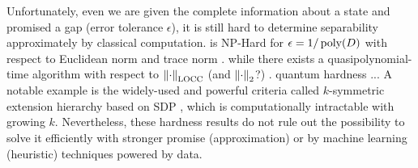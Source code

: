\documentclass[
aps,
pra,
twocolumn,
floatfix,
]{revtex4-2}
\theoremstyle{plain}
\newtheorem{theorem}{Theorem}
\theoremstyle{definition}
\newcommand{\locc}{\textup{LOCC}}
\begin{document}
Unfortunately, even we are given the complete information about a state and promised a gap (error tolerance $\epsilon$), it is still hard to determine separability approximately by classical computation.
 is NP-Hard for $\epsilon=1/\operatorname{\textup{poly}}(D)$ with respect to Euclidean norm and trace norm \cite{gurvitsClassicalDeterministicComplexity2003}.
\cite{ioannouComputationalComplexityQuantum2007}
\cite{dohertyCompleteFamilySeparability2004}
while there exists a quasipolynomial-time algorithm with respect to $\norm{\cdot}_{\locc}$ (and $\norm{\cdot}_2$?) \cite{brandaoQuasipolynomialtimeAlgorithmQuantum2011}.
quantum hardness ... \cite{gutoskiQuantumInteractiveProofs2015}
A notable example is the widely-used and powerful criteria called $k$-symmetric extension hierarchy based on SDP \cite{navascuesPowerSymmetricExtensions2009}, 
which is computationally intractable with growing $k$.
Nevertheless, these hardness results do not rule out the possibility to solve it efficiently with stronger promise (approximation) or by machine learning (heuristic) techniques powered by data.


\end{document}
